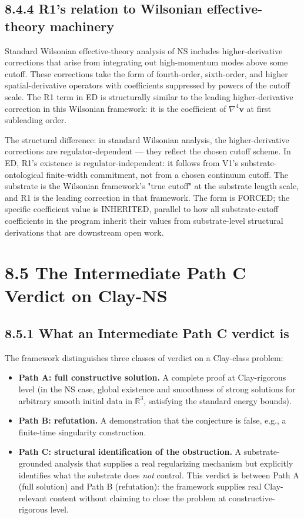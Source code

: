 \documentclass[11pt]{book}
\begin{document}
\subsection{8.4.4 R1's relation to Wilsonian effective-theory machinery}

Standard Wilsonian effective-theory analysis of NS includes higher-derivative corrections that arise from integrating out high-momentum modes above some cutoff. These corrections take the form of fourth-order, sixth-order, and higher spatial-derivative operators with coefficients suppressed by powers of the cutoff scale. The R1 term in ED is structurally similar to the leading higher-derivative correction in this Wilsonian framework: it is the coefficient of $\nabla^4\mathbf{v}$ at first subleading order.

The structural difference: in standard Wilsonian analysis, the higher-derivative corrections are regulator-dependent — they reflect the chosen cutoff scheme. In ED, R1's existence is regulator-independent: it follows from V1's substrate-ontological finite-width commitment, not from a chosen continuum cutoff. The substrate is the Wilsonian framework's "true cutoff" at the substrate length scale, and R1 is the leading correction in that framework. The form is FORCED; the specific coefficient value is INHERITED, parallel to how all substrate-cutoff coefficients in the program inherit their values from substrate-level structural derivations that are downstream open work.

\section{8.5 The Intermediate Path C Verdict on Clay-NS}

\subsection{8.5.1 What an Intermediate Path C verdict is}

The framework distinguishes three classes of verdict on a Clay-class problem:

\begin{itemize}
\item \textbf{Path A: full constructive solution.} A complete proof at Clay-rigorous level (in the NS case, global existence and smoothness of strong solutions for arbitrary smooth initial data in $\mathbb{R}^3$, satisfying the standard energy bounds).
\item \textbf{Path B: refutation.} A demonstration that the conjecture is false, e.g., a finite-time singularity construction.
\item \textbf{Path C: structural identification of the obstruction.} A substrate-grounded analysis that supplies a real regularizing mechanism but explicitly identifies what the substrate does \textit{not} control. This verdict is between Path A (full solution) and Path B (refutation): the framework supplies real Clay-relevant content without claiming to close the problem at constructive-rigorous level.
\end{itemize}
\end{document}
